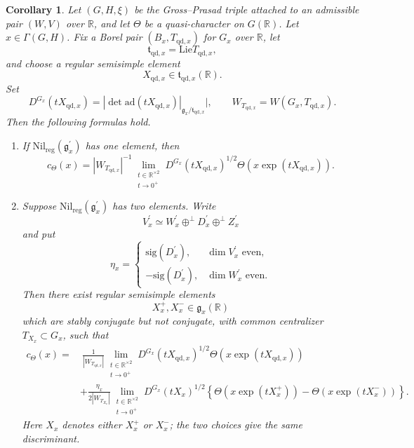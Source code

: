 \documentclass[12pt]{amsart}
\numberwithin{equation}{subsection}
\newcommand{\BR}{{\mathbb {R}}}
\newcommand{\Fg}{{\mathfrak {g}}}
\newcommand{\Ft}{{\mathfrak {t}}}
\newcommand{\Lie}{{\mathrm{Lie}}}
\newcommand{\reg}{{\mathrm{reg}}}
\def\nil{\mathrm{Nil}}
\def\Gam{{\Gamma}}
\def\p{\prime}
\def\ad{\mathrm{ad}}
\def\qd{\mathrm{qd}}
\newtheorem{cor}[thm]{Corollary}
\begin{document}
\begin{cor}\label{cor:germfunaslimitofquasichar}
Let $(G,H,\xi)$ be the Gross--Prasad triple attached to an admissible pair
$(W,V)$ over $\BR$, and let $\Theta$ be a quasi-character on $G(\BR)$. Let
$x\in \Gam(G,H)$. Fix a Borel pair $(B_x,T_{\qd,x})$ for $G_x$ over $\BR$, let
\[
\Ft_{\qd,x}=\Lie T_{\qd,x},
\]
and choose a regular semisimple element
\[
X_{\qd,x}\in \Ft_{\qd,x}(\BR).
\]
Set
\[
D^{G_x}(tX_{\qd,x})
=
|\det \ad(tX_{\qd,x})|_{\Fg_x/\Ft_{\qd,x}}|,
\qquad
W_{T_{\qd,x}}=W(G_x,T_{\qd,x}).
\]
Then the following formulas hold.

\begin{enumerate}
\item If $\nil_\reg(\Fg^\p_x)$ has one element, then
\[
c_\Theta(x)
=
|W_{T_{\qd,x}}|^{-1}
\lim_{\substack{t\in \BR^{\times 2}\\ t\to 0^+}}
D^{G_x}(tX_{\qd,x})^{1/2}
\Theta(x\exp(tX_{\qd,x})).
\]

\item Suppose $\nil_\reg(\Fg^\p_x)$ has two elements. Write
\[
V^\p_x\simeq W^\p_x\oplus^\perp D^\p_x\oplus^\perp Z^\p_x
\]
and put
\[
\eta_x=
\begin{cases}
\mathrm{sig}(D^\p_x), & \dim V^\p_x \text{ even},\\
-\mathrm{sig}(D^\p_x), & \dim W^\p_x \text{ even}.
\end{cases}
\]
Then there exist regular semisimple elements
\[
X_x^+,X_x^-\in \Fg_x(\BR)
\]
which are stably conjugate but not conjugate, with common centralizer
$T_{X_x}\subset G_x$, such that
\begin{align*}
c_\Theta(x)
=&\
\frac{1}{|W_{T_{\qd,x}}|}
\lim_{\substack{t\in \BR^{\times 2}\\ t\to 0^+}}
D^{G_x}(tX_{\qd,x})^{1/2}
\Theta(x\exp(tX_{\qd,x}))
\\
&+
\frac{\eta_x}{2|W_{T_{X_x}}|}
\lim_{\substack{t\in \BR^{\times 2}\\ t\to 0^+}}
D^{G_x}(tX_x)^{1/2}
\left\{
\Theta(x\exp(tX_x^+))
-
\Theta(x\exp(tX_x^-))
\right\}.
\end{align*}
Here $X_x$ denotes either $X_x^+$ or $X_x^-$; the two choices give the same
discriminant.
\end{enumerate}
\end{cor}
\end{document}
